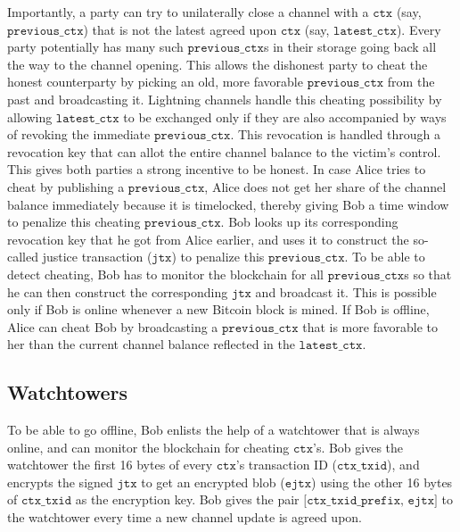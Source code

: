 Importantly, a party can try to unilaterally close a channel with a $\texttt{ctx}$ (say, $\texttt{previous\_ctx}$) that is not the latest agreed upon $\texttt{ctx}$ (say, $\texttt{latest\_ctx}$). Every party potentially has many such $\texttt{previous\_ctx}$s in their storage going back all the way to the channel opening. This allows the dishonest party to cheat the honest counterparty by picking an old, more favorable $\texttt{previous\_ctx}$ from the past and broadcasting it. Lightning channels handle this cheating possibility by allowing $\texttt{latest\_ctx}$ to be exchanged only if they are also accompanied by ways of revoking the immediate $\texttt{previous\_ctx}$. This revocation is handled through a revocation key that can allot the entire channel balance to the victim's control. This gives both parties a strong incentive to be honest. In case Alice tries to cheat by publishing a $\texttt{previous\_ctx}$, Alice does not get her share of the channel balance immediately because it is timelocked, thereby giving Bob a time window to penalize this cheating $\texttt{previous\_ctx}$. Bob looks up its corresponding revocation key that he got from Alice earlier, and uses it to construct the so-called justice transaction ($\texttt{jtx}$) to penalize this $\texttt{previous\_ctx}$. To be able to detect cheating, Bob has to monitor the blockchain for all $\texttt{previous\_ctx}$s so that he can then construct the corresponding $\texttt{jtx}$ and broadcast it. This is possible only if Bob is online whenever a new Bitcoin block is mined. If Bob is offline, Alice can cheat Bob by broadcasting a $\texttt{previous\_ctx}$ that is more favorable to her than the current channel balance reflected in the $\texttt{latest\_ctx}$. 

\subsection{Watchtowers}

To be able to go offline, Bob enlists the help of a watchtower that is always online, and can monitor the blockchain for cheating $\texttt{ctx}$'s. Bob gives the watchtower the first 16 bytes of every $\texttt{ctx}$'s transaction ID ($\texttt{ctx\_txid}$), and encrypts the signed $\texttt{jtx}$ to get an encrypted blob ($\texttt{ejtx}$) using the other 16 bytes of $\texttt{ctx\_txid}$ as the encryption key. Bob gives the pair $\texttt{[ctx\_txid\_prefix, ejtx]}$ to the watchtower every time a new channel update is agreed upon. 

